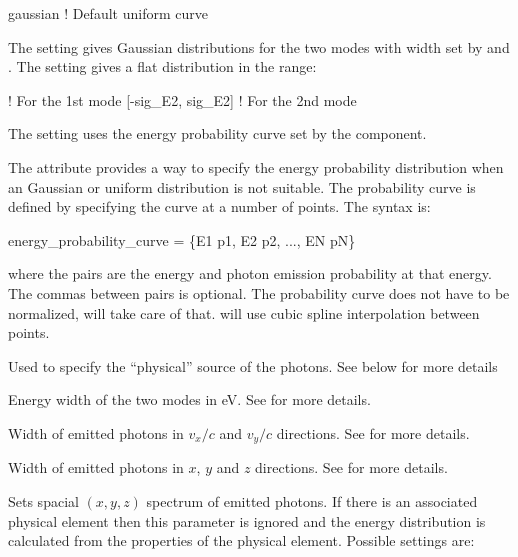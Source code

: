 {\begin{description}
\begin{example}
  gaussian   ! Default
  uniform
  curve
\end{example}
The  setting gives Gaussian distributions for the two modes with width set by
 and . The  setting gives a flat distribution in the range:
\begin{example}
      ! For the 1st mode
  [-sig_E2, sig_E2]  ! For the 2nd mode
\end{example}
The  setting uses the energy probability curve set by the 
component.
%
  \item[\vn{energy_probability_curve}] \Newline
The  attribute provides a way to specify the energy probability
distribution when an Gaussian or uniform distribution is not suitable. The probability curve is
defined by specifying the curve at a number of points. The syntax is:
\begin{example}
  energy_probability_curve = \{E1 p1, E2 p2, ..., EN pN\}
\end{example}
where the  pairs are the energy and photon emission probability at that energy. 
The commas between  pairs is optional.
The probability curve does not have to be normalized, \bmad will take care of that. \bmad will
use cubic spline interpolation between points. 
%
  \item[\vn{physical_source}] \Newline
Used to specify the ``physical'' source of the photons. See below for more details
%
  \item[\vn{sig_E}, \vn{sig_E2}] \Newline
Energy width of the two modes in eV. See  for more details.
%
  \item[\vn{sig_vx, sig_vy}] \Newline
Width of emitted photons in $v_x/c$ and $v_y/c$ directions. See
 for more details.
%
  \item[\vn{sig_x, sig_y, sig_z}] \Newline
Width of emitted photons in $x$, $y$ and $z$ directions. See
 for more details.
%
  \item[\vn{spatial_distribution}] \Newline
Sets spacial $(x, y, z)$ spectrum of emitted photons. If there is an associated physical element
then this parameter is ignored and the energy distribution is calculated from the properties of the
physical element. Possible settings are:

\end{description}}
